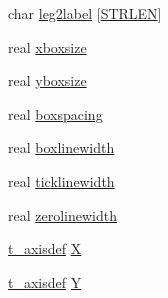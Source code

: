 \begin{DoxyCompactItemize}
char \hyperlink{structt__psrec_a66b8be0c5efe431f2742ab2e8fbecbad}{leg2label} \mbox{[}\hyperlink{share_2template_2gromacs_2types_2simple_8h_a278cf415676752815cfb411cb0b32802}{\-S\-T\-R\-L\-E\-N}\mbox{]}
\item 
real \hyperlink{structt__psrec_a4e062803233d28c89e670663bc0f4271}{xboxsize}
\item 
real \hyperlink{structt__psrec_a56a01cb580ec04c778293ef0b9a3f153}{yboxsize}
\item 
real \hyperlink{structt__psrec_aaf2f5a7157cd6e5d40649608581532aa}{boxspacing}
\item 
real \hyperlink{structt__psrec_aa683d1388c57b2895ab07e0e7909d78a}{boxlinewidth}
\item 
real \hyperlink{structt__psrec_aa8d3588629272723620ab6ab63248162}{ticklinewidth}
\item 
real \hyperlink{structt__psrec_a6917dee80347cabb36bfefd103ef4d85}{zerolinewidth}
\item 
\hyperlink{structt__axisdef}{t\-\_\-axisdef} \hyperlink{structt__psrec_a05c9ac6c0c974aa9b4457a8a39161d12}{\-X}
\item 
\hyperlink{structt__axisdef}{t\-\_\-axisdef} \hyperlink{structt__psrec_a976373d8ae55b441da6d429dae208f2d}{\-Y}
\end{DoxyCompactItemize}


